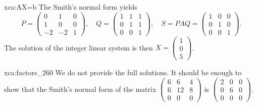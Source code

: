     

\begin{sol}{xca:AX=b}
	The Smith's normal form yields 
	\[
		P=\begin{pmatrix}
			0 & 1 & 0\\
			1 & 0 & 0\\
			-2 & -2 & 1
		\end{pmatrix},
		\quad
		Q=\begin{pmatrix}
			1 & 1 & 1\\
			0 & 1 & 1\\
			0 & 0 & 1
		\end{pmatrix},\quad
		S=PAQ=\begin{pmatrix}
			1 & 0 & 0\\
			0 & 1 & 0\\
			0 & 0 & 1
		\end{pmatrix}.
	\]
	The solution of the integer linear system is then
	$X=\begin{pmatrix}
		1\\
		0\\
		5
	\end{pmatrix}$. 
\end{sol}

\begin{sol}{xca:factors_260}
	We do not provide the full solutions. It should be enough to
	show that the Smith's normal form
	of the matrix $\begin{pmatrix}
		6 & 6 & 4\\
		6 & 12 & 8\\
		0 & 0 & 0
	\end{pmatrix}$ is $\begin{pmatrix}
		2 & 0 & 0\\
		0 & 6 & 0\\
		0 & 0 & 0
	\end{pmatrix}$. 
\end{sol}

